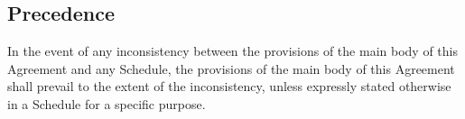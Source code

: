 \subsection{Precedence}
In the event of any inconsistency between the provisions of the main body of this Agreement and any Schedule, the provisions of the main body of this Agreement shall prevail to the extent of the inconsistency, unless expressly stated otherwise in a Schedule for a specific purpose.

